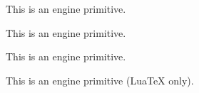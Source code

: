 \begin{function}[]
  {
    \mathchar@type
  }
  \begin{syntax}
  \end{syntax}

\end{function}



\begin{function}[]
  {
    \mathchardef
  }
  \begin{syntax}
  \end{syntax}
  This is an engine primitive.
\end{function}



\begin{function}[]
  {
    \mathchoice
  }
  \begin{syntax}
  \end{syntax}
  This is an engine primitive.
\end{function}



\begin{function}[]
  {
    \mathclose
  }
  \begin{syntax}
  \end{syntax}
  This is an engine primitive.
\end{function}



\begin{function}[]
  {
    \mathdefaultsmode
  }
  \begin{syntax}
  \end{syntax}
  This is an engine primitive (Lua\TeX{} only).
\end{function}



\begin{function}[]
  {
    \mathdollar
  }
  \begin{syntax}
  \end{syntax}

\end{function}



\begin{function}[]
  {
    \mathellipsis
  }
  \begin{syntax}
  \end{syntax}

\end{function}



